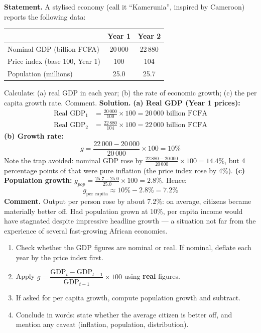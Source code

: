 \documentclass[11pt]{article}
\begin{document}
\begin{exoresolu}
\textbf{Statement.} A stylised economy (call it ``Kamerunia'', inspired by Cameroon) reports the following data:

\begin{center}
\begin{tabular}{|l|c|c|}
\hline
\rowcolor{popblueL} & \textbf{Year 1} & \textbf{Year 2} \\
\hline
Nominal GDP (billion FCFA) & 20\,000 & 22\,880 \\
\hline
Price index (base 100, Year 1) & 100 & 104 \\
\hline
Population (millions) & 25.0 & 25.7 \\
\hline
\end{tabular}
\end{center}

Calculate: (a) real GDP in each year; (b) the rate of economic growth; (c) the per capita growth rate. Comment.
\tcblower
\textbf{Solution.}
\textbf{(a) Real GDP (Year 1 prices):}
\begin{align*}
\text{Real GDP}_1 &= \frac{20\,000}{100}\times 100 = 20\,000 \text{ billion FCFA}\\
\text{Real GDP}_2 &= \frac{22\,880}{104}\times 100 = 22\,000 \text{ billion FCFA}
\end{align*}
\textbf{(b) Growth rate:}
\[ g = \frac{22\,000 - 20\,000}{20\,000}\times 100 = 10\% \]
Note the trap avoided: nominal GDP rose by $\frac{22\,880-20\,000}{20\,000}\times 100 = 14.4\%$, but 4 percentage points of that were pure inflation (the price index rose by 4\%).
\textbf{(c) Population growth:} $g_{pop} = \frac{25.7 - 25.0}{25.0}\times 100 = 2.8\%$. Hence:
\[ g_{\text{per capita}} \approx 10\% - 2.8\% = 7.2\% \]
\textbf{Comment.} Output per person rose by about 7.2\%: on average, citizens became materially better off. Had population grown at 10\%, per capita income would have stagnated despite impressive headline growth --- a situation not far from the experience of several fast-growing African economies.
\end{exoresolu}

\begin{methode}
\begin{enumerate}
\item Check whether the GDP figures are nominal or real. If nominal, deflate each year by the price index first.
\item Apply $g = \dfrac{\text{GDP}_t - \text{GDP}_{t-1}}{\text{GDP}_{t-1}}\times 100$ using \textbf{real} figures.
\item If asked for per capita growth, compute population growth and subtract.
\item Conclude in words: state whether the average citizen is better off, and mention any caveat (inflation, population, distribution).
\end{enumerate}
\end{methode}
\end{document}
